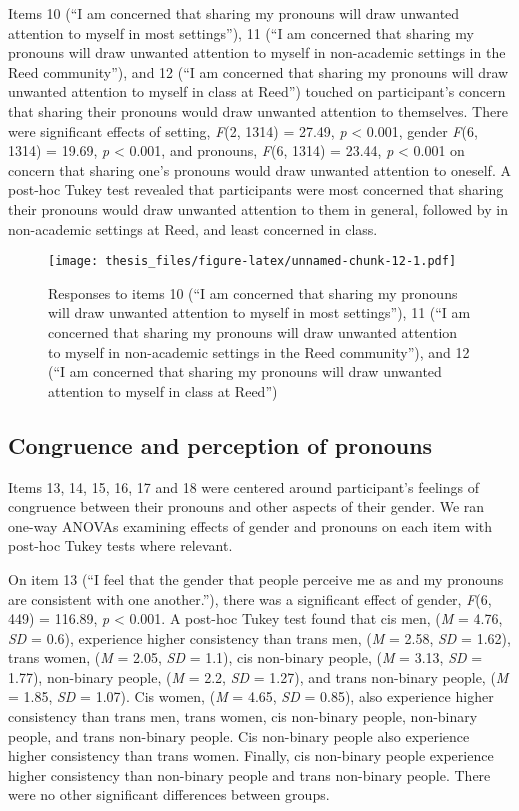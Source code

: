 \documentclass[12pt,twoside]{reedthesis}
\begin{document}
Items 10 (``I am concerned that sharing my pronouns will draw unwanted attention to myself in most settings''), 11 (``I am concerned that sharing my pronouns will draw unwanted attention to myself in non-academic settings in the Reed community''), and 12 (``I am concerned that sharing my pronouns will draw unwanted attention to myself in class at Reed'') touched on participant's concern that sharing their pronouns would draw unwanted attention to themselves. There were significant effects of setting, \emph{F}(2, 1314) = 27.49, \emph{p} \textless{} 0.001, gender \emph{F}(6, 1314) = 19.69, \emph{p} \textless{} 0.001, and pronouns, \emph{F}(6, 1314) = 23.44, \emph{p} \textless{} 0.001 on concern that sharing one's pronouns would draw unwanted attention to oneself. A post-hoc Tukey test revealed that participants were most concerned that sharing their pronouns would draw unwanted attention to them in general, followed by in non-academic settings at Reed, and least concerned in class.
\begin{figure}
\centering
\texttt{[image: thesis\_files/figure-latex/unnamed-chunk-12-1.pdf]}
\caption{\label{fig:unnamed-chunk-12}Responses to items 10 (``I am concerned that sharing my pronouns will draw unwanted attention to myself in most settings''), 11 (``I am concerned that sharing my pronouns will draw unwanted attention to myself in non-academic settings in the Reed community''), and 12 (``I am concerned that sharing my pronouns will draw unwanted attention to myself in class at Reed'')}
\end{figure}
\hypertarget{congruence-and-perception-of-pronouns}{%
\subsection{Congruence and perception of pronouns}\label{congruence-and-perception-of-pronouns}}

Items 13, 14, 15, 16, 17 and 18 were centered around participant's feelings of congruence between their pronouns and other aspects of their gender. We ran one-way ANOVAs examining effects of gender and pronouns on each item with post-hoc Tukey tests where relevant.

On item 13 (``I feel that the gender that people perceive me as and my pronouns are consistent with one another.''), there was a significant effect of gender, \emph{F}(6, 449) = 116.89, \emph{p} \textless{} 0.001. A post-hoc Tukey test found that cis men, (\emph{M} = 4.76, \emph{SD} = 0.6), experience higher consistency than trans men, (\emph{M} = 2.58, \emph{SD} = 1.62), trans women, (\emph{M} = 2.05, \emph{SD} = 1.1), cis non-binary people, (\emph{M} = 3.13, \emph{SD} = 1.77), non-binary people, (\emph{M} = 2.2, \emph{SD} = 1.27), and trans non-binary people, (\emph{M} = 1.85, \emph{SD} = 1.07). Cis women, (\emph{M} = 4.65, \emph{SD} = 0.85), also experience higher consistency than trans men, trans women, cis non-binary people, non-binary people, and trans non-binary people. Cis non-binary people also experience higher consistency than trans women. Finally, cis non-binary people experience higher consistency than non-binary people and trans non-binary people. There were no other significant differences between groups.
\end{document}
